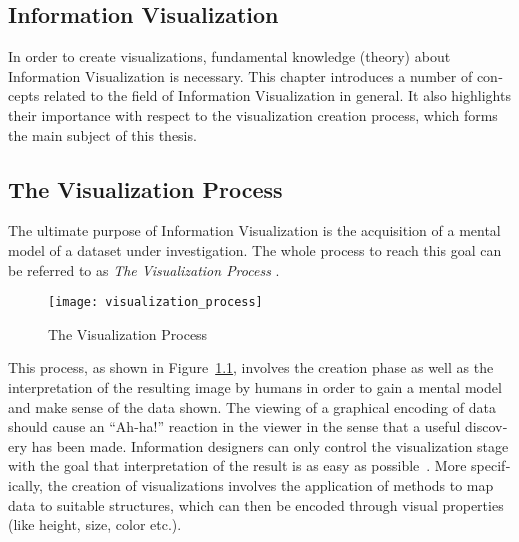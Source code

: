\begin{english}

\chapter{Information Visualization}
\label{cha:infovis}


  


In order to create visualizations, fundamental knowledge (theory) about Information Visualization is necessary. This chapter introduces a number of concepts related to the field of Information Visualization in general. It also highlights their importance with respect to the visualization creation process, which forms the main subject of this thesis.


\section{The Visualization Process}

The ultimate purpose of Information Visualization is the acquisition of a mental model of a dataset under investigation. The whole process to reach this goal can be referred to as \emph{The Visualization Process} \cite{WuenscheLobb01}.

\begin{figure}
\centering
\texttt{[image: visualization\_process]}
\caption{The Visualization Process}
\label{fig:visprocess}
\end{figure}

This process, as shown in Figure~\ref{fig:visprocess}, involves the creation phase as well as the interpretation of the resulting image by humans in order to gain a mental model and make sense of the data shown. The viewing of a graphical encoding of data should cause an ``Ah-ha!'' reaction in the viewer in the sense that a useful discovery has been made. Information designers can only control the visualization stage with the goal that interpretation of the result is as easy as possible~\cite{Holmberg06}. More specifically, the creation of visualizations involves the application of methods to map data to suitable structures, which can then be encoded through visual properties (like height, size, color etc.).


\end{english}
